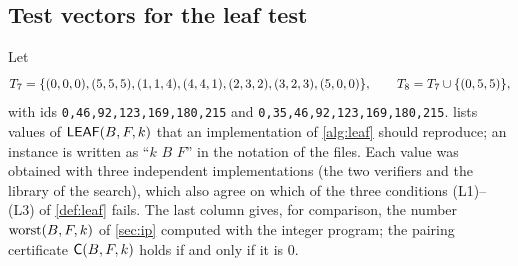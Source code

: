\subsection{Test vectors for the leaf test}\label{ssec:fmt-leaf}

Let
\[
T_7=\{(0,0,0),(5,5,5),(1,1,4),(4,4,1),(2,3,2),(3,2,3),(5,0,0)\},\qquad
T_8=T_7\cup\{(0,5,5)\},
\]
with ids \texttt{0,46,92,123,169,180,215} and \texttt{0,35,46,92,123,169,180,215}. 
lists values of $\mathsf{LEAF}(B,F,k)$ that an implementation of \cref{alg:leaf} should reproduce; an instance is
written as ``$k$ $B$ $F$'' in the notation of the files. Each value was obtained with three independent
implementations (the two verifiers and the library of the search), which also agree on which of the
three conditions (L1)--(L3) of \cref{def:leaf} fails. The last column gives, for comparison, the number
$\operatorname{worst}(B,F,k)$ of \cref{sec:ip} computed with the integer program; the pairing certificate
$\mathsf{C}(B,F,k)$ holds if and only if it is $0$.

